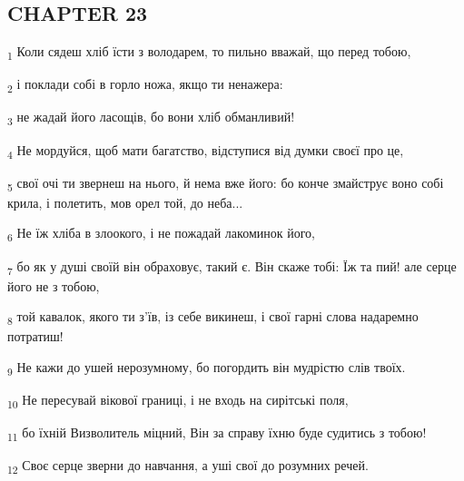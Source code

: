 \subsection{CHAPTER 23}
\begin{tcolorbox}
\textsubscript{1} Коли сядеш хліб їсти з володарем, то пильно вважай, що перед тобою,
\end{tcolorbox}
\begin{tcolorbox}
\textsubscript{2} і поклади собі в горло ножа, якщо ти ненажера:
\end{tcolorbox}
\begin{tcolorbox}
\textsubscript{3} не жадай його ласощів, бо вони хліб обманливий!
\end{tcolorbox}
\begin{tcolorbox}
\textsubscript{4} Не мордуйся, щоб мати багатство, відступися від думки своєї про це,
\end{tcolorbox}
\begin{tcolorbox}
\textsubscript{5} свої очі ти звернеш на нього, й нема вже його: бо конче змайструє воно собі крила, і полетить, мов орел той, до неба...
\end{tcolorbox}
\begin{tcolorbox}
\textsubscript{6} Не їж хліба в злоокого, і не пожадай лакоминок його,
\end{tcolorbox}
\begin{tcolorbox}
\textsubscript{7} бо як у душі своїй він обраховує, такий є. Він скаже тобі: Їж та пий! але серце його не з тобою,
\end{tcolorbox}
\begin{tcolorbox}
\textsubscript{8} той кавалок, якого ти з'їв, із себе викинеш, і свої гарні слова надаремно потратиш!
\end{tcolorbox}
\begin{tcolorbox}
\textsubscript{9} Не кажи до ушей нерозумному, бо погордить він мудрістю слів твоїх.
\end{tcolorbox}
\begin{tcolorbox}
\textsubscript{10} Не пересувай вікової границі, і не входь на сирітські поля,
\end{tcolorbox}
\begin{tcolorbox}
\textsubscript{11} бо їхній Визволитель міцний, Він за справу їхню буде судитись з тобою!
\end{tcolorbox}
\begin{tcolorbox}
\textsubscript{12} Своє серце зверни до навчання, а уші свої до розумних речей.
\end{tcolorbox}
